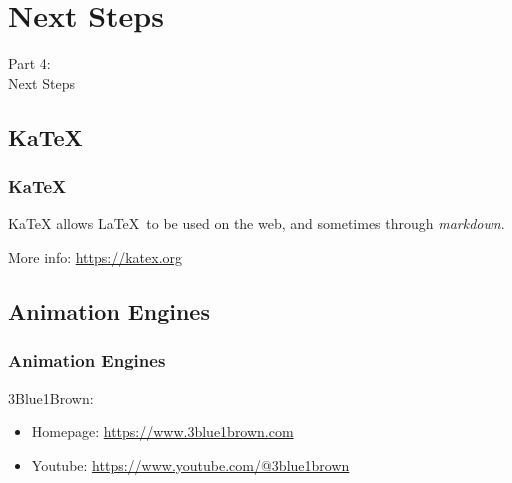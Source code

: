 {
\renewcommand{\bgcolor}{next}

\section{Next Steps}
\begin{frame}
  \vspace{25mm}
  \begin{center}
    \Huge{Part 4\pause:\\Next Steps}
  \end{center}
\end{frame}

\subsection{KaTeX}
\begin{frame}[fragile]
  \frametitle{KaTeX}
  \vspace{3mm}
  KaTeX allows \LaTeX\ to be used on the web, and sometimes through \textsl{markdown}.
  
  \vspace{5mm}
  More info: \url{https://katex.org}
  
\end{frame}

\subsection{Animation Engines}
\begin{frame}[fragile]
  \frametitle{Animation Engines}
  \vspace{3mm}
  3Blue1Brown:
  \begin{itemize}
    \item Homepage: \textcolor{blue}{\url{https://www.3blue1brown.com}}
    \item Youtube: \textcolor{blue}{\url{https://www.youtube.com/@3blue1brown}}
  \end{itemize}
  

\end{frame}}
